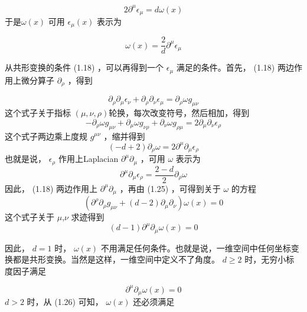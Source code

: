 \begin{equation}
2 \partial^{\mu} \epsilon_{\mu}=d \omega(x)
\end{equation}
于是$ \omega(x)$ 可用 $\epsilon_\mu(x)$ 表示为

\begin{equation}
	\omega(x)=\frac{2}{d} \partial^{\mu} \epsilon_{\mu}
\end{equation}

从共形变换的条件 (1.18) ，可以再得到一个 $\epsilon_\mu$ 满足的条件。首先， (1.18) 两边作用上微分算子 $\partial_\rho$ ，得到

\begin{equation}
	\partial_{\rho} \partial_{\mu} \epsilon_{\nu}+\partial_{\rho} \partial_{\nu} \epsilon_{\mu}=\partial_{\rho} \omega g_{\mu \nu}
\end{equation}
这个式子关于指标 $(\mu,\nu,\rho) $轮换，每次改变符号，然后相加，得到
\begin{equation}
	-\partial_{\rho} \omega g_{\mu \nu}+\partial_{\mu} \omega g_{\nu \rho}+\partial_{\nu} \omega g_{\rho \mu}=2 \partial_{\mu} \partial_{\nu} \epsilon_{\rho}
\end{equation}
这个式子两边乘上度规 $g^{\mu\nu}$ ，缩并得到
\begin{equation}
		(-d+2) \partial_{\rho} \omega=2 \partial^{\mu} \partial_{\mu} \epsilon_{\rho}
\end{equation}
也就是说， $\epsilon_\rho$ 作用上Laplacian $\partial^{\mu} \partial_{\mu}$ ，可用 $\omega$ 表示为
\begin{equation}
	\partial^{\mu} \partial_{\mu} \epsilon_{\rho}=\frac{2-d}{2} \partial_{\rho} \omega
\end{equation}
因此， (1.18) 两边作用上 $\partial^{\mu} \partial_{\mu}$ ，再由 (1.25) ，可得到关于 $\omega$ 的方程
\begin{equation}
	\left(\partial^{\rho} \partial_{\rho} g_{\mu \nu}+(d-2) \partial_{\mu} \partial_{\nu}\right) \omega(x)=0
\end{equation}
这个式子关于 $\mu$,$\nu$ 求迹得到
\begin{equation}
	(d-1) \partial^{\mu} \partial_{\mu} \omega(x)=0
\end{equation}

因此， $d=1$ 时， $\omega(x)$ 不用满足任何条件。也就是说，一维空间中任何坐标变换都是共形变换。当然是这样，一维空间中定义不了角度。 $d\geq 2$ 时，无穷小标度因子满足

\begin{equation}
	\partial^{\mu} \partial_{\mu} \omega(x)=0
\end{equation}
$d>2$ 时，从 (1.26) 可知， $\omega(x)$ 还必须满足

